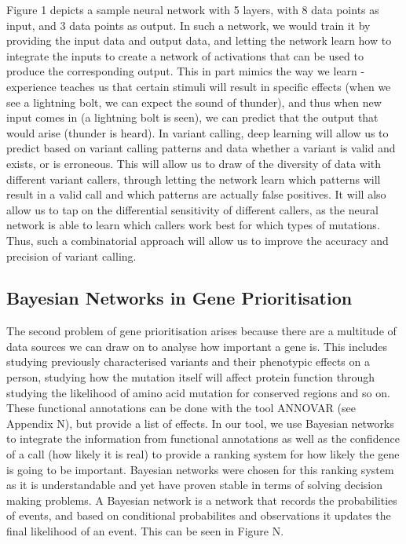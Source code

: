 \documentclass{article}
\begin{document}
Figure 1 depicts a sample neural network with 5 layers, with 8 data points as input, and 3 data points as output. In such a network, we would train it by providing the input data and output data, and letting the network learn how to integrate the inputs to create a network of activations that can be used to produce the corresponding output. This in part mimics the way we learn - experience teaches us that certain stimuli will result in specific effects (when we see a lightning bolt, we can expect the sound of thunder), and thus when new input comes in (a lightning bolt is seen), we can predict that the output that would arise (thunder is heard). In variant calling, deep learning will allow us to predict based on variant calling patterns and data whether a variant is valid and exists, or is erroneous. This will allow us to draw of the diversity of data with different variant callers, through letting the network learn which patterns will result in a valid call and which patterns are actually false positives. It will also allow us to tap on the differential sensitivity of different callers, as the neural network is able to learn which callers work best for which types of mutations. Thus, such a combinatorial approach will allow us to improve the accuracy and precision of variant calling.\\

\subsection{Bayesian Networks in Gene Prioritisation}
The second problem of gene prioritisation arises because there are a multitude of data sources we can draw on to analyse how important a gene is. This includes studying previously characterised variants and their phenotypic effects on a person, studying how the mutation itself will affect protein function through studying the likelihood of amino acid mutation for conserved regions and so on. These functional annotations can be done with the tool ANNOVAR (see Appendix N), but provide a list of effects. In our tool, we use Bayesian networks to integrate the information from functional annotations as well as the confidence of a call (how likely it is real) to provide a ranking system for how likely the gene is going to be important. Bayesian networks were chosen for this ranking system as it is understandable and yet have proven stable in terms of solving decision making problems. A Bayesian network is a network that records the probabilities of events, and based on conditional probabilites and observations it updates the final likelihood of an event. This can be seen in Figure N.
\end{document}
